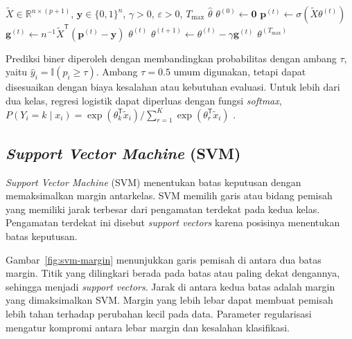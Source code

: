 \begin{algorithm}[H]
    \caption{Estimasi parameter regresi logistik dengan penurunan gradien batch}
    \label{alg:logistic-regression}
    \begin{algorithmic}[1]
        \REQUIRE $\widetilde{X}\in\mathbb{R}^{n\times(p+1)}$, $\mathbf{y}\in\{0,1\}^{n}$, $\gamma>0$, $\varepsilon>0$, $T_{\max}$
        \ENSURE $\hat{\theta}$
        \STATE $\theta^{(0)}\leftarrow\mathbf{0}$
        \STATE $\mathbf{p}^{(t)}\leftarrow\sigma(\widetilde{X}\theta^{(t)})$
        \STATE $\mathbf{g}^{(t)}\leftarrow n^{-1}\widetilde{X}^{\mathsf{T}}(\mathbf{p}^{(t)}-\mathbf{y})$
        \RETURN $\theta^{(t)}$
        \ENDIF
        \STATE $\theta^{(t+1)}\leftarrow\theta^{(t)}-\gamma\mathbf{g}^{(t)}$
        \ENDFOR
        \RETURN $\theta^{(T_{\max})}$
    \end{algorithmic}
\end{algorithm}

Prediksi biner diperoleh dengan membandingkan probabilitas dengan ambang $\tau$, yaitu $\hat{y}_i=\mathbb{I}(p_i\geq\tau)$. Ambang $\tau=0.5$ umum digunakan, tetapi dapat disesuaikan dengan biaya kesalahan atau kebutuhan evaluasi. Untuk lebih dari dua kelas, regresi logistik dapat diperluas dengan fungsi \textit{softmax}, $P(Y_i=k\mid x_i)=\exp(\theta_k^{\mathsf{T}}\tilde{x}_i)/\sum_{r=1}^{K}\exp(\theta_r^{\mathsf{T}}\tilde{x}_i)$ \cite{james2021islr}.

\subsection{\textit{Support Vector Machine} (SVM)}

\textit{Support Vector Machine} (SVM) menentukan batas keputusan dengan memaksimalkan margin antarkelas. SVM memilih garis atau bidang pemisah yang memiliki jarak terbesar dari pengamatan terdekat pada kedua kelas. Pengamatan terdekat ini disebut \textit{support vectors} karena posisinya menentukan batas keputusan.

Gambar~\ref{fig:svm-margin} menunjukkan garis pemisah di antara dua batas margin. Titik yang dilingkari berada pada batas atau paling dekat dengannya, sehingga menjadi \textit{support vectors}. Jarak di antara kedua batas adalah margin yang dimaksimalkan SVM. Margin yang lebih lebar dapat membuat pemisah lebih tahan terhadap perubahan kecil pada data. Parameter regularisasi mengatur kompromi antara lebar margin dan kesalahan klasifikasi.

